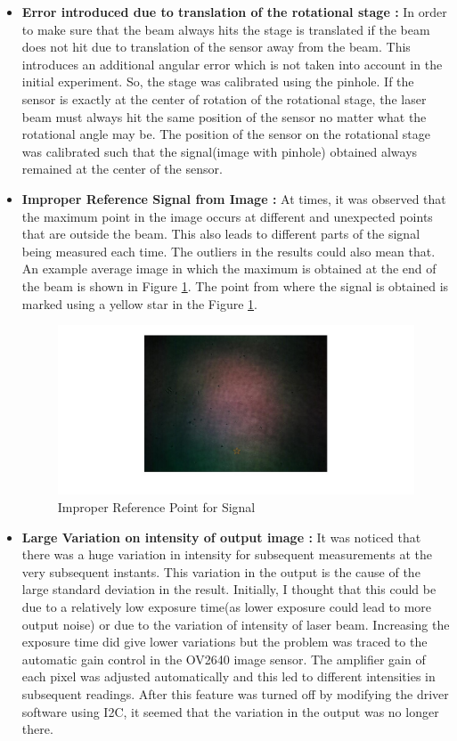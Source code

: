 \begin{itemize}
\item \textbf{Error introduced due to translation of the rotational stage :} In order to make sure that the beam always hits the stage is translated if the beam does not hit due to translation of the sensor away from the beam. This introduces an additional angular error which is not taken into account in the initial experiment. So, the stage was calibrated using the pinhole. If the sensor is exactly at the center of rotation of the rotational stage, the laser beam must always hit the same position of the sensor no matter what the rotational angle may be. The position of the sensor on the rotational stage was calibrated such that the signal(image with pinhole) obtained always remained at the center of the sensor. 

\item \textbf{Improper Reference Signal from Image :} At times, it was observed that the maximum point in the image occurs at different and unexpected points that are outside the beam. This also leads to different parts of the signal being measured each time. The outliers in the results could also mean that. An example average image in which the maximum is obtained at the end of the beam is shown in Figure \ref{fig:exp_acc_improper}. The point from where the signal is obtained is marked using a yellow star in the Figure \ref{fig:exp_acc_improper}.
\begin{figure}[ht]
\centering
\includegraphics[scale=0.50]{pics/ImproperDetection.jpg}
\caption{Improper Reference Point for Signal}
\label{fig:exp_acc_improper}
\end{figure}
\item \textbf{Large Variation on intensity of output image :} It was noticed that there was a huge variation in intensity for subsequent measurements at the very subsequent instants. This variation in the output is the cause of the large standard deviation in the result. Initially, I thought that this could be due to a relatively low exposure time(as lower exposure could lead to more output noise) or due to the variation of intensity of laser beam. Increasing the exposure time did give lower variations but the problem was traced to the automatic gain control in the OV2640 image sensor. The amplifier gain of each pixel was adjusted automatically and this led to different intensities in subsequent readings. After this feature was turned off by modifying the driver software using I2C, it seemed that the variation in the output was no longer there.


\end{itemize}
